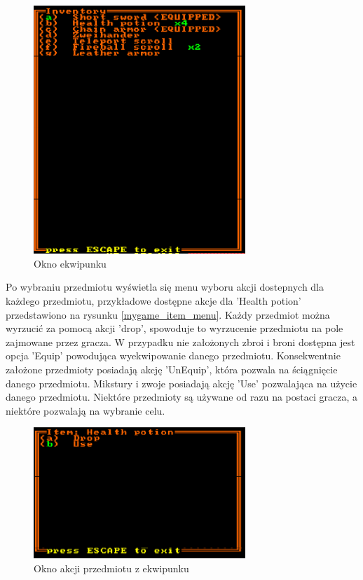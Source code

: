 \documentclass[12pt,twoside]{article}
\begin{document}
\FloatBarrier
\begin{figure}[h]
	\centering
	\includegraphics[width=8cm]{images/mygame/inv.png}
	\caption{Okno ekwipunku}
	\label{mygame:inv}
\end{figure}
\FloatBarrier

Po wybraniu przedmiotu wyświetla się menu wyboru akcji dostepnych dla każdego przedmiotu, przykładowe dostępne akcje dla 'Health potion' przedstawiono na rysunku \ref{mygame_item_menu}. Każdy przedmiot można wyrzucić za pomocą akcji 'drop', spowoduje to wyrzucenie przedmiotu na pole zajmowane przez gracza. W przypadku nie założonych zbroi i broni dostępna jest opcja 'Equip' powodująca wyekwipowanie danego przedmiotu. Konsekwentnie założone przedmioty posiadają akcję 'UnEquip', która pozwala na ściągnięcie danego przedmiotu. Mikstury i zwoje posiadają akcję 'Use' pozwalająca na użycie danego przedmiotu. Niektóre przedmioty są używane od razu na postaci gracza, a niektóre pozwalają na wybranie celu.

\FloatBarrier
\begin{figure}[h]
	\centering
	\includegraphics[width=8cm]{images/mygame/item_menu.png}
	\caption{Okno akcji przedmiotu z ekwipunku}
	\label{mygame:item_menu}
\end{figure}
\FloatBarrier
\end{document}
